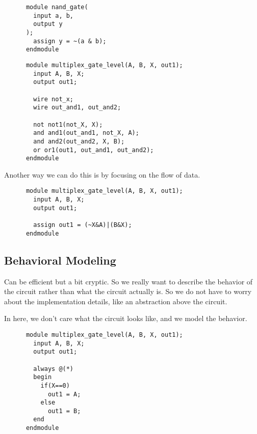   \begin{definition}
    \begin{lstlisting}
      module nand_gate(
        input a, b,
        output y
      );
        assign y = ~(a & b);
      endmodule 
    \end{lstlisting}
  \end{definition}

  \begin{example}
    \begin{lstlisting}
      module multiplex_gate_level(A, B, X, out1); 
        input A, B, X; 
        output out1; 

        wire not_x; 
        wire out_and1, out_and2; 

        not not1(not_X, X); 
        and and1(out_and1, not_X, A); 
        and and2(out_and2, X, B); 
        or or1(out1, out_and1, out_and2); 
      endmodule
    \end{lstlisting}
  \end{example}

  Another way we can do this is by focusing on the flow of data. 

  \begin{example}
    \begin{lstlisting}
      module multiplex_gate_level(A, B, X, out1); 
        input A, B, X; 
        output out1; 

        assign out1 = (~X&A)|(B&X);
      endmodule
    \end{lstlisting}
  \end{example}

\subsection{Behavioral Modeling}

  Can be efficient but a bit cryptic. So we really want to describe the behavior of the circuit rather than what the circuit actually is. So we do not have to worry about the implementation details, like an abstraction above the circuit. 

  \begin{example}
    In here, we don't care what the circuit looks like, and we model the behavior. 
    \begin{lstlisting}
      module multiplex_gate_level(A, B, X, out1); 
        input A, B, X; 
        output out1; 

        always @(*)
        begin
          if(X==0) 
            out1 = A; 
          else 
            out1 = B; 
        end
      endmodule
    \end{lstlisting}
  \end{example}

